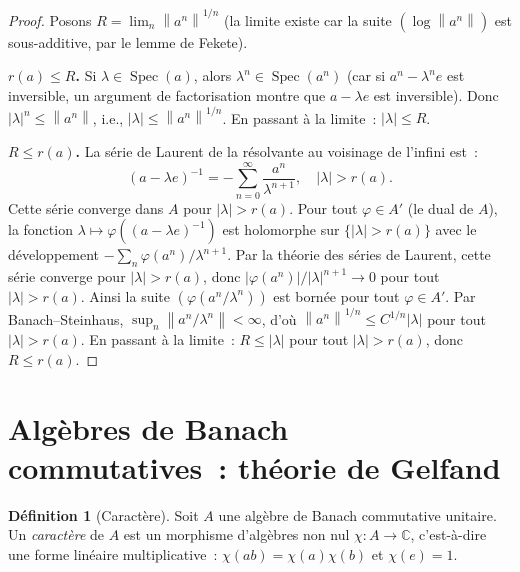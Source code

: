 \documentclass[a4paper,12pt]{book}
\DeclareMathOperator{\Spec}{Spec}
\newcommand{\C}{\mathbb{C}}
\newcommand{\norm}[1]{\left\| #1 \right\|}
\newcommand{\abs}[1]{\left| #1 \right|}
\theoremstyle{definition}
\newtheorem{definition}{Définition}[chapter]
\theoremstyle{plain}
\theoremstyle{remark}
\begin{document}
\begin{proof}
Posons $R = \lim_{n} \norm{a^n}^{1/n}$ (la limite existe car la suite
$(\log\norm{a^n})$ est sous-additive, par le lemme de Fekete).

\textbf{$r(a) \le R$.} Si $\lambda \in \Spec(a)$, alors $\lambda^n \in \Spec(a^n)$
(car si $a^n - \lambda^n e$ est inversible, un argument de factorisation montre que
$a - \lambda e$ est inversible). Donc $\abs{\lambda}^n \le \norm{a^n}$, i.e.,
$\abs{\lambda} \le \norm{a^n}^{1/n}$. En passant à la limite~: $\abs{\lambda} \le R$.

\textbf{$R \le r(a)$.} La série de Laurent de la résolvante au voisinage de l'infini
est~:
\[
  (a - \lambda e)^{-1} = -\sum_{n=0}^\infty \frac{a^n}{\lambda^{n+1}},
  \quad \abs{\lambda} > r(a).
\]
Cette série converge dans $A$ pour $\abs{\lambda} > r(a)$. Pour tout $\varphi \in A'$
(le dual de $A$), la fonction $\lambda \mapsto \varphi((a - \lambda e)^{-1})$ est
holomorphe sur $\{\abs{\lambda} > r(a)\}$ avec le développement
$-\sum_n \varphi(a^n)/\lambda^{n+1}$. Par la théorie des séries de Laurent, cette série
converge pour $\abs{\lambda} > r(a)$, donc
$\abs{\varphi(a^n)}/\abs{\lambda}^{n+1} \to 0$ pour tout $\abs{\lambda} > r(a)$.
Ainsi la suite $(\varphi(a^n/\lambda^n))$ est bornée pour tout $\varphi \in A'$. Par
Banach--Steinhaus, $\sup_n \norm{a^n/\lambda^n} < \infty$, d'où
$\norm{a^n}^{1/n} \le C^{1/n}\abs{\lambda}$ pour tout $\abs{\lambda} > r(a)$.
En passant à la limite~: $R \le \abs{\lambda}$ pour tout $\abs{\lambda} > r(a)$, donc
$R \le r(a)$.
\end{proof}

\section{Algèbres de Banach commutatives~: théorie de Gelfand}

\begin{definition}[Caractère]
\label{def:caractere}
Soit $A$ une algèbre de Banach commutative unitaire. Un \emph{caractère} de $A$ est un
morphisme d'algèbres non nul $\chi : A \to \C$, c'est-à-dire une forme linéaire
multiplicative~: $\chi(ab) = \chi(a)\chi(b)$ et $\chi(e) = 1$.
\end{definition}
\end{document}
